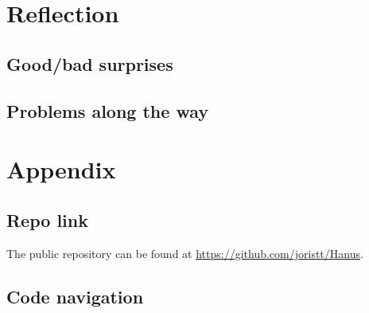 \documentclass[12pt,a4paper]{article}
\begin{document}
\section{Reflection}
	\subsection{Good/bad surprises}
	\subsection{Problems along the way}
	
\section{Appendix}
	\subsection{Repo link}
	The public repository can be found at \url{https://github.com/joristt/Hanus}.
	\subsection{Code navigation}

\newpage


\end{document}
